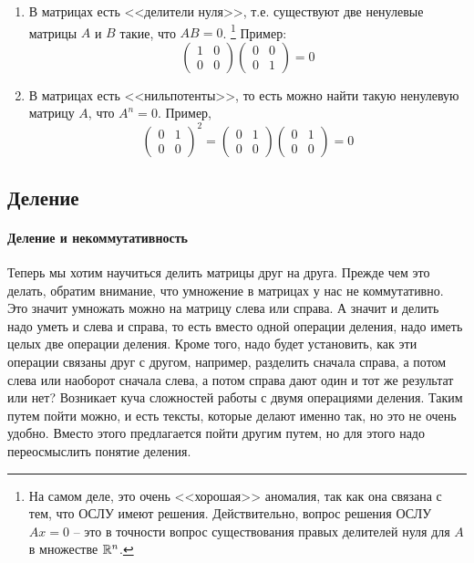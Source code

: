 \begin{enumerate}
\item В матрицах есть <<делители нуля>>, т.е. существуют две ненулевые матрицы $A$ и $B$ такие, что $AB = 0$.%
\footnote{На самом деле, это очень <<хорошая>> аномалия, так как она связана с тем, что ОСЛУ имеют решения.
Действительно, вопрос решения ОСЛУ $Ax = 0$ -- это в точности вопрос существования правых делителей нуля для $A$ в множестве $\mathbb R^{n}$.}
Пример:
\[
\begin{pmatrix}
{1}&{0}\\
{0}&{0}
\end{pmatrix}
\begin{pmatrix}
{0}&{0}\\
{0}&{1}
\end{pmatrix}
=0
\]

\item В матрицах есть <<нильпотенты>>, то есть можно найти такую ненулевую матрицу $A$, что $A^n=0$.
Пример, 
\[
\begin{pmatrix}
{0}&{1}\\
{0}&{0}
\end{pmatrix}^2
=
\begin{pmatrix}
{0}&{1}\\
{0}&{0}
\end{pmatrix}
\begin{pmatrix}
{0}&{1}\\
{0}&{0}
\end{pmatrix}
=0
\]
\end{enumerate}

\subsection{Деление}

\paragraph{Деление и некоммутативность}

Теперь мы хотим научиться делить матрицы друг на друга.
Прежде чем это делать, обратим внимание, что умножение в матрицах у нас не коммутативно.
Это значит умножать можно на матрицу слева или справа.
А значит и делить надо уметь и слева и справа, то есть вместо одной операции деления, надо иметь целых две операции деления.
Кроме того, надо будет установить, как эти операции связаны друг с другом, например, разделить сначала справа, а потом слева или наоборот сначала слева, а потом справа дают один и тот же результат или нет?
Возникает куча сложностей работы с двумя операциями деления.
Таким путем пойти можно, и есть тексты, которые делают именно так, но это не очень удобно.
Вместо этого предлагается пойти другим путем, но для этого надо переосмыслить понятие деления.


